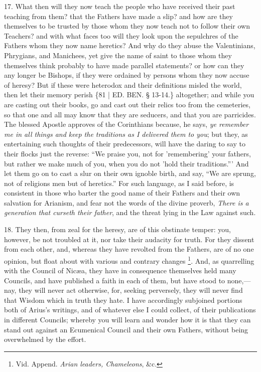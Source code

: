 17. What then will they now
teach the people who have received their past teaching from them? that
the Fathers have made a slip? and how are they themselves to be
trusted by those whom they now teach not to follow their own Teachers?
and with what faces too will they look upon the sepulchres of the
Fathers whom they now name heretics? And why do they abuse the
Valentinians, Phrygians, and Manichees, yet give the name of saint to
those whom they themselves think probably to have made parallel
statements? or how can they any longer be Bishops, if they were
ordained by persons whom they now accuse of heresy? But if these were
heterodox and their definitions misled the world, then let their
memory perish \{81 | ED.
BEN.
§ 13-14.\} altogether; and while you are casting out their books, go
and cast out their relics too from the cemeteries, so that one and all
may know that they are seducers, and that you are parricides. The
blessed Apostle approves of the Corinthians because, he says, \emph{ye
remember me in all things and keep the traditions as I delivered them
to you}; but they, as entertaining such thoughts of their
predecessors, will have the daring to say to their flocks just the
reverse: ``We praise you, not for 'remembering' your fathers, but
rather we make much of you, when you do not 'hold their traditions.'''
And let them go on to cast a slur on their own ignoble birth, and say,
``We are sprung, not of religions men but of heretics.'' For such
language, as I said before, is consistent in those who barter the good
name of their Fathers and their own salvation for Arianism, and fear
not the words of the divine proverb, \emph{There is a generation that
curseth their father}, and the threat lying in the Law against
such.

18. They then, from zeal for
the heresy, are of this obstinate temper: you, however, be not
troubled at it, nor take their audacity for truth. For they dissent
from each other, and, whereas they have revolted from the Fathers, are
of no one opinion, but float about with various and contrary changes \footnote{Vid. Append. \emph{Arian leaders, Chameleons}, \&c.}. And, as quarrelling with the Council of Nicæa, they have in
consequence themselves held many Councils, and have published a faith
in each of them, but have stood to none,—nay, they will never act
otherwise, for, seeking perversely, they will never find that Wisdom
which in truth they hate. I have accordingly subjoined portions both
of Arius's writings, and of whatever else I could collect, of their
publications in different Councils; whereby you will learn and wonder
how it is that they can stand out against an Ecumenical Council and
their own Fathers, without being overwhelmed by the effort.

